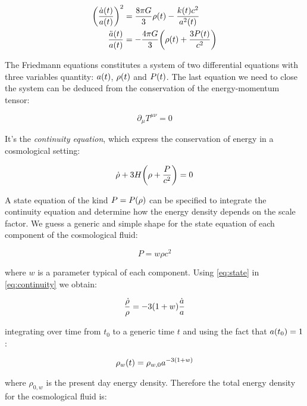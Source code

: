 \begin{align}
        \qty(\frac{\dot a\qty(t)}{a\qty(t)})^2 & = \frac{8\pi G}{3} \rho\qty(t)
        - \frac{k\qty(t) c^2}{a^2\qty(t)}
        \label{eq:friedmann_1} \\
        \frac{\ddot a\qty(t)}{a\qty(t)} & = -\frac{4\pi G}{3}
        \qty(\rho\qty(t) + \frac{3 P\qty(t)}{c^2})
        \label{eq:friedmann_2}
\end{align}

The Friedmann equations constitutes a system of two differential equations
with three variables quantity: $a\qty(t)$, $\rho\qty(t)$ and $P\qty(t)$.
The last equation we need to close the system can be deduced from the
conservation of the energy-momentum tensor:

\begin{equation}
        \partial_\mu T^{\mu \nu} = 0
\end{equation}

It's the \emph{continuity equation}, which express the conservation of energy in a
cosmological setting:

\begin{equation}
        \dot \rho + 3 H \qty(\rho + \frac{P}{c^2}) = 0
        \label{eq:continuity}
\end{equation}

A state equation of the kind $P = P\qty(\rho)$ can be specified to
integrate the continuity equation and determine how the energy density
depends on the scale factor. We guess a generic and simple shape for the
state equation of each component of the cosmological fluid:

\begin{equation}
        P = w \rho c^2
        \label{eq:state}
\end{equation}

where $w$ is a parameter typical of each component.
Using \autoref{eq:state} in \autoref{eq:continuity} we obtain:

\begin{equation}
        \frac{\dot \rho}{\rho} = -3\qty(1 + w) \frac{\dot a}{a}
\end{equation}

integrating over time from $t_0$ to a generic time $t$ and using the fact
that $a\qty(t_0) = 1$:

\begin{equation}
        \rho_w\qty(t) = \rho_{w,0} a^{-3\qty(1 + w)}
\end{equation}

where $\rho_{0,w}$ is the present day energy density.
Therefore the total energy density for the cosmological fluid is:

